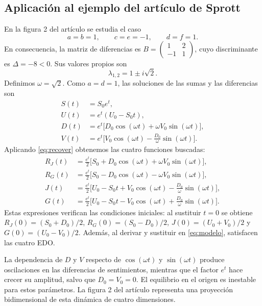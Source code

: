 \documentclass[10pt,letterpaper]{article}
\newcommand{\RJ}{R_{J}}
\newcommand{\RG}{R_{G}}
\newcommand{\mat}[1]{\begin{pmatrix}#1\end{pmatrix}}
\begin{document}
\subsection{Aplicación al ejemplo del artículo de Sprott}
En la figura 2 del artículo se estudia el caso
\begin{equation}\label{eq:sprott}
a=b=1,\qquad c=e=-1,\qquad d=f=1.
\end{equation}
En consecuencia, la matriz de diferencias es $B=\mat{1&2\\-1&1}$, cuyo discriminante es $\Delta=-8<0$. Sus valores propios son
\begin{equation}
\lambda_{1,2}=1\pm i\sqrt2.
\end{equation}
Definimos $\omega=\sqrt2$. Como $a=d=1$, las soluciones de las sumas y las diferencias son
\begin{equation}\label{eq:aux_sprott}
\boxed{\begin{aligned}
S(t)&=S_0e^t,\\
U(t)&=e^t(U_0-S_0t),\\
D(t)&=e^t\bigl[D_0\cos(\omega t)+\omega V_0\sin(\omega t)\bigr],\\
V(t)&=e^t\bigl[V_0\cos(\omega t)-\tfrac{D_0}{\omega}\sin(\omega t)\bigr].
\end{aligned}}
\end{equation}
Aplicando \eqref{eq:recover} obtenemos las cuatro funciones buscadas:
\begin{equation}\label{eq:sol_sprott}
\boxed{\begin{aligned}
\RJ(t)&=\frac{e^t}{2}\bigl[S_0+D_0\cos(\omega t)+\omega V_0\sin(\omega t)\bigr],\\[3pt]
\RG(t)&=\frac{e^t}{2}\bigl[S_0-D_0\cos(\omega t)-\omega V_0\sin(\omega t)\bigr],\\[3pt]
J(t)&=\frac{e^t}{2}\bigl[U_0-S_0t+V_0\cos(\omega t)-\tfrac{D_0}{\omega}\sin(\omega t)\bigr],\\[3pt]
G(t)&=\frac{e^t}{2}\bigl[U_0-S_0t-V_0\cos(\omega t)+\tfrac{D_0}{\omega}\sin(\omega t)\bigr].
\end{aligned}}
\end{equation}
Estas expresiones verifican las condiciones iniciales: al sustituir $t=0$ se obtiene $\RJ(0)=(S_0+D_0)/2$, $\RG(0)=(S_0-D_0)/2$, $J(0)=(U_0+V_0)/2$ y $G(0)=(U_0-V_0)/2$. Además, al derivar y sustituir en \eqref{eq:modelo}, satisfacen las cuatro EDO.

La dependencia de $D$ y $V$ respecto de $\cos(\omega t)$ y $\sin(\omega t)$ produce oscilaciones en las diferencias de sentimientos, mientras que el factor $e^t$ hace crecer su amplitud, salvo que $D_0=V_0=0$. El equilibrio en el origen es inestable para estos parámetros. La figura 2 del artículo representa una proyección bidimensional de esta dinámica de cuatro dimensiones.
\end{document}
